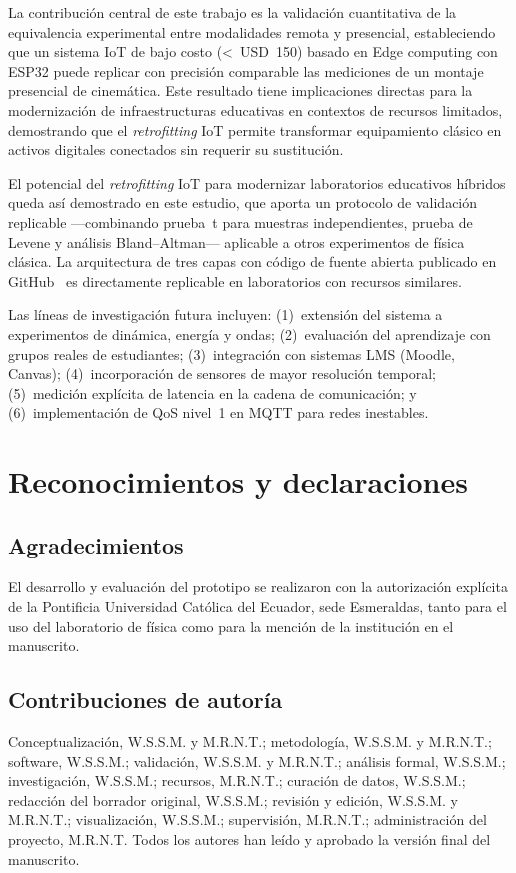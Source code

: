 \documentclass{espol-rte}
\begin{document}
La contribuci\'on central de este trabajo es la validaci\'on cuantitativa de la equivalencia experimental entre modalidades remota y presencial, estableciendo que un sistema IoT de bajo costo (<~USD~150) basado en Edge computing con ESP32 puede replicar con precisi\'on comparable las mediciones de un montaje presencial de cinem\'atica. Este resultado tiene implicaciones directas para la modernizaci\'on de infraestructuras educativas en contextos de recursos limitados, demostrando que el \textit{retrofitting} IoT permite transformar equipamiento cl\'asico en activos digitales conectados sin requerir su sustituci\'on.

El potencial del \textit{retrofitting} IoT para modernizar laboratorios educativos h\'ibridos queda as\'i demostrado en este estudio, que aporta un protocolo de validaci\'on replicable ---combinando prueba~t para muestras independientes, prueba de Levene y an\'alisis Bland--Altman--- aplicable a otros experimentos de f\'isica cl\'asica. La arquitectura de tres capas con c\'odigo de fuente abierta publicado en GitHub~\parencite{r15} es directamente replicable en laboratorios con recursos similares.

Las l\'ineas de investigaci\'on futura incluyen: (1)~extensi\'on del sistema a experimentos de din\'amica, energ\'ia y ondas; (2)~evaluaci\'on del aprendizaje con grupos reales de estudiantes; (3)~integraci\'on con sistemas LMS (Moodle, Canvas); (4)~incorporaci\'on de sensores de mayor resoluci\'on temporal; (5)~medici\'on expl\'icita de latencia en la cadena de comunicaci\'on; y (6)~implementaci\'on de QoS nivel~1 en MQTT para redes inestables.


\section{Reconocimientos y declaraciones}

\subsection{Agradecimientos}
El desarrollo y evaluaci\'on del prototipo se realizaron con la autorizaci\'on expl\'icita de la Pontificia Universidad Cat\'olica del Ecuador, sede Esmeraldas, tanto para el uso del laboratorio de f\'isica como para la menci\'on de la instituci\'on en el manuscrito.

\subsection{Contribuciones de autor\'ia}
Conceptualizaci\'on, W.S.S.M. y M.R.N.T.; metodolog\'ia, W.S.S.M. y M.R.N.T.; software, W.S.S.M.; validaci\'on, W.S.S.M. y M.R.N.T.; an\'alisis formal, W.S.S.M.; investigaci\'on, W.S.S.M.; recursos, M.R.N.T.; curaci\'on de datos, W.S.S.M.; redacci\'on del borrador original, W.S.S.M.; revisi\'on y edici\'on, W.S.S.M. y M.R.N.T.; visualizaci\'on, W.S.S.M.; supervisi\'on, M.R.N.T.; administraci\'on del proyecto, M.R.N.T. Todos los autores han le\'ido y aprobado la versi\'on final del manuscrito.
\end{document}
